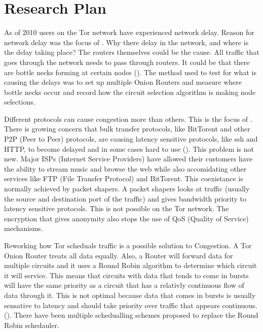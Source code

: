 \documentclass[letterpaper,12pt]{texMemo}
\begin{document}
\section*{Research Plan}
    As of 2010 users on the Tor network have experienced network delay. Reason for network delay was the
    focus of \citeauthor[]{delay}.  Why there delay in the network, and
    where is the delay taking place? The routers themselves could be the cause. All traffic that
    goes through the network needs to pass through routers. It could be that there are bottle
    necks forming at certain nodes (\citeauthor{delay}). The method used to test for what is causing the delays was
    to set up multiple Onion Routers and measure where bottle necks occur and record how the circuit
    selection algorithm is making node selections.

    Different protocols can cause congestion more than others. This is the focus of
    \citeauthor{analysis}.  There is growing concern that bulk transfer protocols, like BitTorent
    and other P2P (Peer to Peer) protocols, are causing latency sensitive protocols, like ssh and
    HTTP, to become delayed and in some cases hard to use (\citeauthor[2]{analysis}). This problem
    is not new.  Major ISPs (Internet Service Providers) have allowed 
    their customers have the ability to stream music and browse the web while also accomidating other
    services like FTP (File Transfer Protocol) and BitTorent. This coexistance is normally achieved
    by packet shapers. A packet shapers looks at traffic (usually the source and destination port of
    the traffic) and gives bandwidth priority to latency sensitive protocols. This is not possible on
    the Tor network. The encryption that gives anonymity also stops the use of QoS (Quality of
    Service) mechanisms.

    Reworking how Tor scheduals traffic is a possible solution to Congestion.  A Tor Onion Router
    treats all data equally. Also, a Router will forward data for multiple circuits and it uses a Round Robin
    algorithm to determine which circuit it will service. This means that circuits with data that
    tends to come in bursts will have the same priority as a circuit that has a relativly continuous
    flow of data through it. This is not optimal because data that comes in bursts is usually
    sensative to latency and should take priority over traffic that appears continuous.
    (\citeauthor[2]{unfair}).  There have been multiple schedualling schemes proposed to replace the
    Round Robin schedauler.
\end{document}
